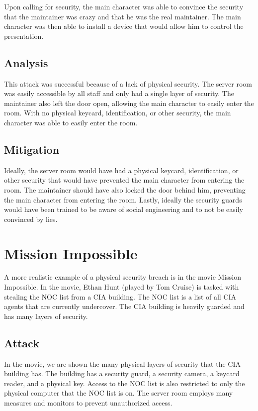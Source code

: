 \documentclass[acmsmall]{acmart}
\begin{document}
Upon calling for security, the main character was able to convince the security that the
maintainer was crazy and that he was the real maintainer. The main character was then able
to install a device that would allow him to control the presentation.

\subsection{Analysis}
This attack was successful because of a lack of physical security. The server room was
easily accessible by all staff and only had a single layer of security. The maintainer
also left the door open, allowing the main character to easily enter the room.
With no physical keycard, identification, or other security, the main character was
able to easily enter the room.

\subsection{Mitigation}
Ideally, the server room would have had a physical keycard, identification, or other
security that would have prevented the main character from entering the room. The
maintainer should have also locked the door behind him, preventing the main character
from entering the room. Lastly, ideally the security guards would have been trained
to be aware of social engineering and to not be easily convinced by lies.

\section{Mission Impossible \texorpdfstring{\cite{missionimpossible}}{}}
A more realistic example of a physical security breach is in the movie
Mission Impossible. In the movie, Ethan Hunt (played by Tom Cruise) is tasked
with stealing the NOC list from a CIA building. The NOC list is a list of all
CIA agents that are currently undercover. The CIA building is heavily guarded
and has many layers of security.

\subsection{Attack}
In the movie, we are shown the many physical layers of security that the CIA
building has. The building has a security guard, a security camera, a keycard
reader, and a physical key. Access to the NOC list is also restricted to only
the physical computer that the NOC list is on. The server room employs many
measures and monitors to prevent unauthorized access.
\end{document}
